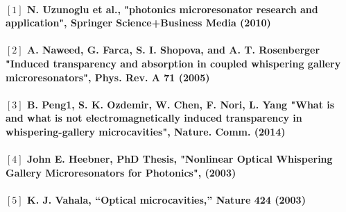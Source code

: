 \paragraph{\normalfont \large $[1]$  N. Uzunoglu et al., "photonics  microresonator research and application", Springer Science+Business Media (2010) \\ 
\\$[2]$ A. Naweed, G. Farca, S. I. Shopova, and A. T. Rosenberger "Induced transparency and absorption in coupled whispering gallery microresonators", Phys. Rev. A \textbf{71} (2005)\\
\\$[3]$ B. Peng1, S. K. Ozdemir, W. Chen, F. Nori, L. Yang "What is and what is not electromagnetically induced transparency in whispering-gallery microcavities", Nature. Comm. (2014) \\
\\$[4]$ John E. Heebner, PhD Thesis, "Nonlinear Optical Whispering Gallery Microresonators for Photonics", (2003)  \\
\\$[5]$ K. J. Vahala, “Optical microcavities,” Nature \textbf{424} (2003) }